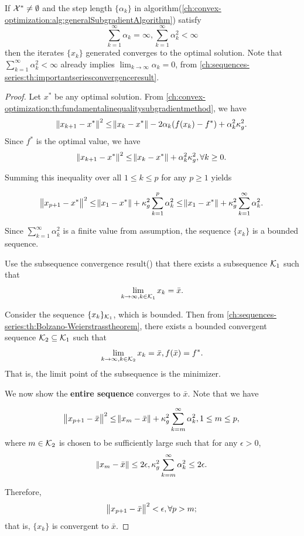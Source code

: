 \begin{refsection}
\begin{theorem}\cite[157]{bertsekas2015convex}
If $\mathcal{X}^* \neq \emptyset$ and the step length $\{\alpha_k\}$ in algorithm(\autoref{ch:convex-optimization:alg:generalSubgradientAlgorithm}) satisfy
$$\sum_{k=1}^\infty \alpha_k = \infty, \sum_{k=1}^\infty \alpha_k^2 < \infty $$
then the iterates $\{x_k\}$ generated converges to the optimal solution.	
Note that $\sum_{k=1}^\infty \alpha_k^2 < \infty$ already implies $\lim_{k\to \infty}\alpha_k = 0$, from \autoref{ch:sequences-series:th:importantseriesconvergenceresult}.
\end{theorem}
\begin{proof}
Let $x^*$ be any optimal solution. From \autoref{ch:convex-optimization:th:fundamentalinequalitysubgradientmethod}, we have 
$$\norm{x_{k+1} - x^*}^2 \leq \norm{x_k - x^*} - 2\alpha_k(f(x_k) - f^*) + \alpha_k^2 \kappa_g^2.$$
Since $f^*$ is the optimal value, we have
$$\norm{x_{k+1} - x^*}^2 \leq \norm{x_k - x^*} + \alpha_k^2 \kappa_g^2, \forall k \geq 0.$$

Summing this inequality over all $1\leq k \leq p$ for any $p \geq 1$ yields

$$\norm{x_{p+1} - x^*}^2 \leq \norm{x_1 - x^*} + \kappa_g^2 \sum_{k=1}^p \alpha_k^2 \leq \norm{x_1 - x^*} + \kappa_g^2 \sum_{k=1}^\infty \alpha_k^2.$$

Since $\sum_{k=1}^\infty \alpha_k^2$ is a finite value from assumption, the sequence $\{x_k\}$ is a bounded sequence.
 
Use the subsequence convergence result() that there exists a subsequence $\mathcal{K}_1$ such that
$$\lim_{k\to \infty,k\in\mathcal{K}_1} x_k = \bar{x}.$$

Consider the sequence $\{x_k\}_{\mathcal{K}_1}$, which is bounded. 
Then from \autoref{ch:sequences-series:th:Bolzano-Weierstrasstheorem}, there exists a bounded convergent sequence $\mathcal{K}_2 \subseteq \mathcal{K}_1$ such that
$$\lim_{k\to \infty,k\in\mathcal{K}_2} x_k = \bar{x}, f(\bar{x}) = f^*.$$
That is, the limit point of the subsequence is the minimizer.

We now show the \textbf{entire sequence} converges to $\bar{x}$. Note that we have

$$\norm{x_{p+1} - \bar{x}}^2 \leq \norm{x_m - \bar{x}} + \kappa_g^2 \sum_{k=m}^\infty \alpha_k^2 , 1\leq m \leq p,$$
where $m\in\mathcal{K}_2$ is chosen to be sufficiently large such that for any $\epsilon > 0$,
$$\norm{x_m - \bar{x}}\leq 2\epsilon, \kappa_g^2 \sum_{k=m}^\infty \alpha_k^2 \leq 2\epsilon.$$

Therefore, 
$$\norm{x_{p+1} - \bar{x}}^2 < \epsilon, \forall p > m;$$
that is, $\{x_k\}$ is convergent to $\bar{x}$.
\end{proof}



\end{refsection}
